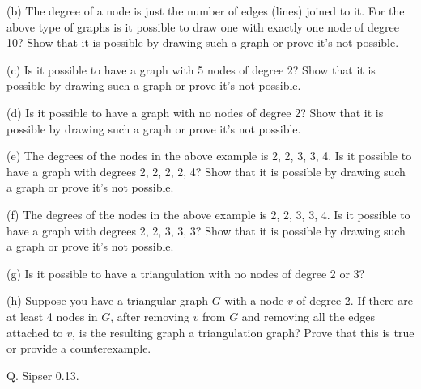 (b) The degree of a node is just the number of edges (lines) joined to it.
For the above type of graphs is it possible to draw one 
with exactly one node of degree 10? 
Show that it is possible by drawing such a graph or prove it's not possible.

(c) Is it possible to have a graph with 5 nodes of degree 2? 
Show that it is possible by drawing such a graph or prove it's not possible.

(d) Is it possible to have a graph with no nodes of degree 2? 
Show that it is possible by drawing such a graph or prove it's not possible.

(e) The degrees of the nodes in the above example is 2, 2, 3, 3, 4.
Is it possible to have a graph with degrees 2, 2, 2, 2, 4?
Show that it is possible by drawing such a graph or prove it's not possible.

(f) The degrees of the nodes in the above example is 2, 2, 3, 3, 4.
Is it possible to have a graph with degrees 2, 2, 3, 3, 3?
Show that it is possible by drawing such a graph or prove it's not possible.

(g) Is it possible to have a triangulation with no nodes of degree 2 or 3?

(h) Suppose you have a triangular graph $G$ with a node $v$ of degree 2.
If there are at least 4 nodes in $G$, after removing $v$ from $G$
and removing all the edges attached to $v$, is the resulting graph
a triangulation graph? 
Prove that this is true or provide a counterexample.
       
\SOLUTION



\newpage
Q.
Sipser 0.13.

\SOLUTION




